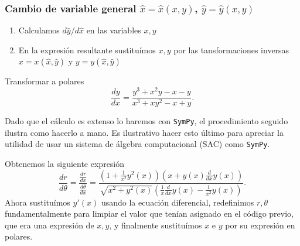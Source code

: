 \subsubsection{Cambio de variable general $\hat{x}=\hat{x}(x,y)$, $\hat{y}=\hat{y}(x,y)$}
\begin{enumerate}
  \item Calculamos $d\hat{y}/d\hat{x}$ en las variables $x,y$

   \item En la expresión resultante sustituímos $x,y$ por las tansformaciones 			inversas $x=x(\hat{x},\hat{y})$ y  $y=y(\hat{x},\hat{y})$
\end{enumerate}



\begin{ejemplo}\label{ej:cambio_forma} Transformar a polares
 \[
  \frac{dy}{dx}=\frac{y^3+x^2y-x-y}{x^3+xy^2-x+y}.
 \]
\end{ejemplo}

Dado que el cálculo es extenso lo haremos con \texttt{SymPy}, el procedimiento seguido ilustra como hacerlo a mano. Es ilustrativo hacer esto último para apreciar la utilidad de usar un sistema de álgebra computacional (SAC) como \texttt{SymPy}.



Obtenemos la siguiente expresión 
\[\frac{dr}{d\theta}=\frac{\frac{dr}{dx}}{\frac{d\theta}{dx}}=\frac{\left(1 + \frac{1}{x^{2}} y^{2}{\left (x \right )}\right) \left(x + y{\left (x \right )} \frac{d}{d x} y{\left (x \right )}\right)}{\sqrt{x^{2} + y^{2}{\left (x \right )}} \left(\frac{1}{x} \frac{d}{d x} y{\left (x \right )} - \frac{1}{x^{2}} y{\left (x \right )}\right)}.\]
Ahora sustituímos $y'(x)$ usando la ecuación diferencial, redefinimos $r,\theta$ fundamentalmente para limpiar el valor que tenían asignado en el código previo, que era una expresión de $x,y$, y finalmente sustituímos $x$ e $y$ por su expresión en polares.

